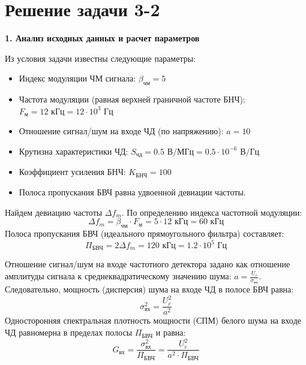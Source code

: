 \section{Решение задачи 3-2}

\vspace{1em}
\textbf{1. Анализ исходных данных и расчет параметров}

Из условия задачи известны следующие параметры:
\begin{itemize}
    \item Индекс модуляции ЧМ сигнала: $\beta_{\text{чм}} = 5$
    \item Частота модуляции (равная верхней граничной частоте БНЧ): $F_{\text{м}} = 12 \text{ кГц} = 12 \cdot 10^3 \text{ Гц}$
    \item Отношение сигнал/шум на входе ЧД (по напряжению): $a = 10$
    \item Крутизна характеристики ЧД: $S_{\text{чд}} = 0.5 \text{ В/МГц} = 0.5 \cdot 10^{-6} \text{ В/Гц}$
    \item Коэффициент усиления БНЧ: $K_{\text{БНЧ}} = 100$
    \item Полоса пропускания БВЧ равна удвоенной девиации частоты.
\end{itemize}

Найдем девиацию частоты $\Delta f_m$. По определению индекса частотной модуляции:
\begin{equation*}
    \Delta f_m = \beta_{\text{чм}} \cdot F_{\text{м}} = 5 \cdot 12 \text{ кГц} = 60 \text{ кГц}
\end{equation*}
Полоса пропускания БВЧ (идеального прямоугольного фильтра) составляет:
\begin{equation*}
    \Pi_{\text{БВЧ}} = 2\Delta f_m = 120 \text{ кГц} = 1.2 \cdot 10^5 \text{ Гц}
\end{equation*}

Отношение сигнал/шум на входе частотного детектора задано как отношение амплитуды сигнала к среднеквадратическому значению шума: $a = \frac{U_c}{\sigma_{\text{вх}}}$. Следовательно, мощность (дисперсия) шума на входе ЧД в полосе БВЧ равна:
\begin{equation*}
    \sigma_{\text{вх}}^2 = \frac{U_c^2}{a^2}
\end{equation*}
Односторонняя спектральная плотность мощности (СПМ) белого шума на входе ЧД равномерна в пределах полосы $\Pi_{\text{БВЧ}}$ и равна:
\begin{equation*}
    G_{\text{вх}} = \frac{\sigma_{\text{вх}}^2}{\Pi_{\text{БВЧ}}} = \frac{U_c^2}{a^2 \cdot \Pi_{\text{БВЧ}}}
\end{equation*}

